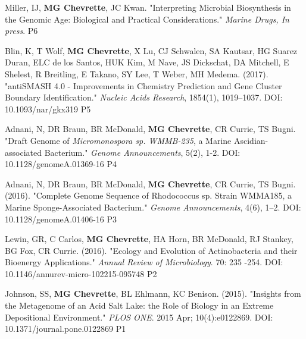 \begin{cvpubs}
  \cvpub
    {Miller, IJ, \textbf{MG Chevrette}, JC Kwan. "Interpreting Microbial Biosynthesis in the Genomic Age: Biological and Practical Considerations." \textit{Marine Drugs, In press}.} %
    {P6} %

  \cvpub
    {Blin, K, T Wolf, \textbf{MG Chevrette}, X Lu, CJ Schwalen, SA Kautsar, HG Suarez Duran, ELC de los Santos, HUK Kim, M Nave, JS Dickschat, DA Mitchell, E Shelest, R Breitling, E Takano, SY Lee, T Weber, MH Medema. (2017). "antiSMASH 4.0 - Improvements in Chemistry Prediction and Gene Cluster Boundary Identification." \textit{Nucleic Acids Research}, 1854(1), 1019–1037. DOI: 10.1093/nar/gkx319}  %
    {P5} %

  \cvpub
    {Adnani, N, DR Braun, BR McDonald, \textbf{MG Chevrette}, CR Currie, TS Bugni. "Draft Genome of \textit{Micromonospora sp. WMMB-235}, a Marine Ascidian-associated Bacterium." \textit{Genome Announcements}, 5(2), 1-2. DOI: 10.1128/genomeA.01369-16} %
    {P4} %

  \cvpub
  {Adnani, N, DR Braun, BR McDonald, \textbf{MG Chevrette}, CR Currie, TS Bugni. (2016). "Complete Genome Sequence of Rhodococcus sp. Strain WMMA185, a Marine Sponge-Associated Bacterium." \textit{Genome Announcements}, 4(6), 1–2. DOI: 10.1128/genomeA.01406-16} %
    {P3} %

  \cvpub
    {Lewin, GR, C Carlos, \textbf{MG Chevrette}, HA Horn, BR McDonald, RJ Stankey, BG Fox, CR Currie. (2016). "Ecology and Evolution of Actinobacteria and their Bioenergy Applications." \textit{Annual Review of Microbiology}. 70: 235 -254. DOI: 10.1146/annurev-micro-102215-095748} %
    {P2} %

  \cvpub
    {Johnson, SS, \textbf{MG Chevrette}, BL Ehlmann, KC Benison. (2015). "Insights from the Metagenome of an Acid Salt Lake: the Role of Biology in an Extreme Depositional Environment."  \textit{PLOS ONE}. 2015 Apr; 10(4):e0122869. DOI: 10.1371/journal.pone.0122869} %
    {P1} %

\end{cvpubs}

\newpage

